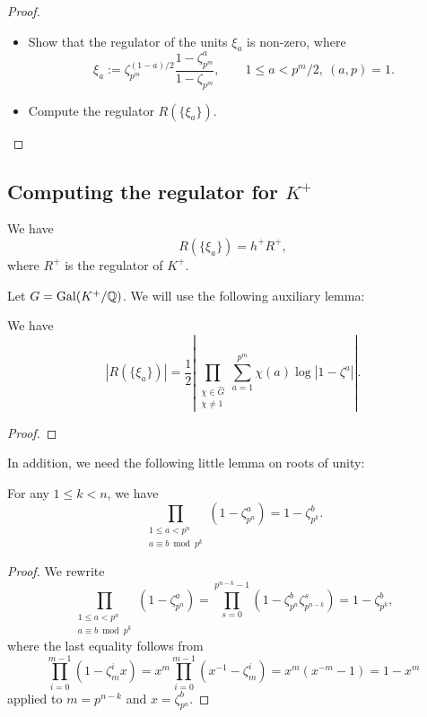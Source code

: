 \begin{proof}
    \begin{itemize}
        \item Show that the regulator of the units $\xi_a$ is non-zero, where 
        $$
        \xi_a := \zeta_{p^m}^{(1-a)/2} \frac{1 - \zeta_{p^m}^a}{1 - \zeta_{p^m}}, \qquad 1 \leq a < p^m / 2, \ (a, p) = 1.
        $$
        \item Compute the regulator $R(\{\xi_a\})$. 
    \end{itemize}
\end{proof}

\subsection{Computing the regulator for $K^+$}

\begin{lemma}\label{lem:reg_Ra}
    We have
    $$
    R(\{\xi_a\}) = h^+ R^+, 
    $$
    where $R^+$ is the regulator of $K^+$.
\end{lemma}

Let $G = \operatorname{Gal}(K^+ / \mathbb{Q})$. We will use the following auxiliary lemma:

\begin{lemma}\label{lem:reg_Ra_charsum}
    We have 
    $$
    | R(\{\xi_a\}) | = \frac{1}{2} \left | \prod_{\substack{\chi \in \widehat{G} \\ \chi \ne 1}} \sum_{a = 1}^{p^m} \chi(a) \log |1 - \zeta^a| \right |. 
    $$
\end{lemma}

\begin{proof}
\end{proof}

In addition, we need the following little lemma on roots of unity: 

\begin{lemma}\label{lem:prod_cycl_units}
    For any $1 \leq k < n$, we have 
    $$
    \prod_{\substack{1 \leq a < p^n \\ a \equiv b \bmod p^k}} (1 - \zeta_{p^n}^a) = 1 - \zeta_{p^k}^b.   
    $$
\end{lemma}

\begin{proof}
    We rewrite 
    $$
    \prod_{\substack{1 \leq a < p^n \\ a \equiv b \bmod p^k}} (1 - \zeta_{p^n}^a) = \prod_{s = 0}^{p^{n-k}-1}(1 - \zeta_{p^n}^b \zeta_{p^{n-k}}^s) = 1 - \zeta_{p^k}^b,
    $$
    where the last equality follows from  
    $$
    \prod_{i = 0}^{m-1} (1 - \zeta_m^i x)= x^m \prod_{i = 0}^{m-1} (x^{-1} - \zeta_m^i) = x^m (x^{-m} - 1) = 1 - x^m
    $$
    applied to $m = p^{n-k}$ and $x = \zeta_{p^n}^b$. 
\end{proof}

